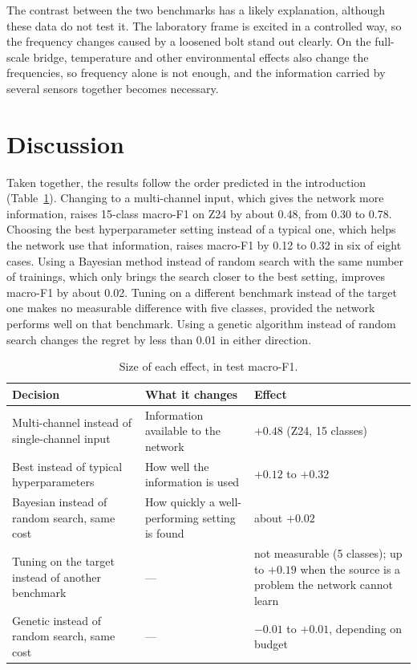 \documentclass[11pt,a4paper]{article}
\begin{document}
The contrast between the two benchmarks has a likely explanation, although these data do not test it. The laboratory frame is excited in a controlled way, so the frequency changes caused by a loosened bolt stand out clearly. On the full-scale bridge, temperature and other environmental effects also change the frequencies, so frequency alone is not enough, and the information carried by several sensors together becomes necessary.

\section{Discussion}\label{sec:discussion}

Taken together, the results follow the order predicted in the introduction (Table~\ref{tab:summary}). Changing to a multi-channel input, which gives the network more information, raises 15-class macro-F1 on Z24 by about 0.48, from 0.30 to 0.78. Choosing the best hyperparameter setting instead of a typical one, which helps the network use that information, raises macro-F1 by 0.12 to 0.32 in six of eight cases. Using a Bayesian method instead of random search with the same number of trainings, which only brings the search closer to the best setting, improves macro-F1 by about 0.02. Tuning on a different benchmark instead of the target one makes no measurable difference with five classes, provided the network performs well on that benchmark. Using a genetic algorithm instead of random search changes the regret by less than 0.01 in either direction.

\begin{table}[htbp]
  \centering
  \caption{Size of each effect, in test macro-F1.}
  \label{tab:summary}
  \small
  \begin{tabularx}{\textwidth}{@{}>{\raggedright\arraybackslash}X >{\raggedright\arraybackslash}X >{\raggedright\arraybackslash}X@{}}
    \toprule
    Decision & What it changes & Effect \\
    \midrule
    Multi-channel instead of single-channel input & Information available to the network & $+0.48$ (Z24, 15 classes) \\
    Best instead of typical hyperparameters & How well the information is used & $+0.12$ to $+0.32$ \\
    Bayesian instead of random search, same cost & How quickly a well-performing setting is found & about $+0.02$ \\
    Tuning on the target instead of another benchmark & --- & not measurable (5 classes); up to $+0.19$ when the source is a problem the network cannot learn \\
    Genetic instead of random search, same cost & --- & $-0.01$ to $+0.01$, depending on budget \\
    \bottomrule
  \end{tabularx}
\end{table}
\end{document}
